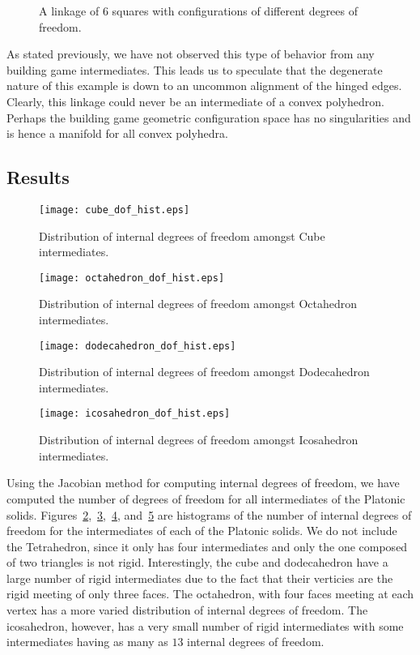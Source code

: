 \begin{figure}[ht]
\caption{A linkage of 6 squares with configurations of different degrees of freedom.}
\label{fig:SixSq}
\end{figure}

As stated previously, we have not observed this type of behavior from any building game intermediates. This leads us to speculate that the degenerate nature of this example is down to an uncommon alignment of the hinged edges. Clearly, this linkage could never be an intermediate of a convex polyhedron. Perhaps the building game geometric configuration space has no singularities and is hence a manifold for all convex polyhedra.  

\subsection{Results}


\begin{figure}[ht]
\centering
  \texttt{[image: cube\_dof\_hist.eps]}
\caption{Distribution of internal degrees of freedom amongst Cube intermediates.}
\label{fig:CubeDoFHist}
\end{figure}

\begin{figure}[ht]
\centering
  \texttt{[image: octahedron\_dof\_hist.eps]}
\caption{Distribution of internal degrees of freedom amongst Octahedron intermediates.}
\label{fig:OctaDoFHist}
\end{figure}

\begin{figure}[ht]
\centering
  \texttt{[image: dodecahedron\_dof\_hist.eps]}
\caption{Distribution of internal degrees of freedom amongst Dodecahedron intermediates.}
\label{fig:DodecDoFHist}
\end{figure}

\begin{figure}[ht]
\centering
  \texttt{[image: icosahedron\_dof\_hist.eps]}
\caption{Distribution of internal degrees of freedom amongst Icosahedron intermediates.}
\label{fig:IcosaDoFHist}
\end{figure}

Using the Jacobian method for computing internal degrees of freedom, we have computed the number of degrees of freedom for all intermediates of the Platonic solids. Figures~\ref{fig:CubeDoFHist},~\ref{fig:OctaDoFHist},~\ref{fig:DodecDoFHist}, and~\ref{fig:IcosaDoFHist} are histograms of the number of internal degrees of freedom for the intermediates of each of the Platonic solids. We do not include the Tetrahedron, since it only has four intermediates and only the one composed of two triangles is not rigid. Interestingly, the cube and dodecahedron have a large number of rigid intermediates due  to the fact that their verticies are the rigid meeting of only three faces. The octahedron, with four faces meeting at each vertex has a more varied distribution of internal degrees of freedom. The icosahedron, however, has a very small number of rigid intermediates with some intermediates having as many as $13$ internal degrees of freedom. 

